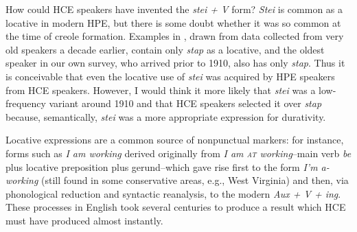 How could HCE speakers have invented the \textit{stei + V} form? \textit{Stei} is common as a locative in modern HPE, but there is some doubt whether it was so common at the time of creole formation. Examples in \citet{Nagara1972}, drawn from data collected from very old speakers a decade earlier, contain only \textit{stap} as a locative, and the oldest speaker in our own survey, who arrived prior to 1910, also has only \textit{stap}. Thus it is conceivable that even the locative use of \textit{stei} was acquired by HPE speakers from HCE speakers. However, I would think it more likely that \textit{stei} was a low-frequency variant around 1910 and that HCE speakers selected it over \textit{stap} because, semantically, \textit{stei} was a more appropriate expression for durativity.

Locative expressions are a common source of nonpunctual markers: for instance, forms such as \textit{I am working} derived originally from \textit{I am \textsc{at} working}--main verb \textit{be} plus locative preposition plus
gerund--which gave rise first to the form \textit{I'm a-working} (still found in some conservative areas, e.g., West Virginia) and then, via phonological reduction and syntactic reanalysis, to the modern \textit{Aux + V + ing}. These processes in English took several centuries to produce a result which HCE must have produced almost instantly.

